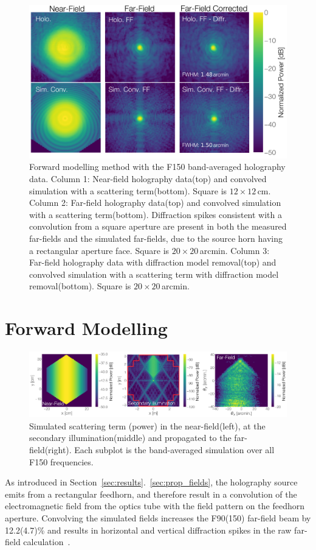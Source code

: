 \begin{figure}[t!]
    \centering
    \includegraphics[width = .9\textwidth]{Figures/forward_convolve_highres.pdf}
    \caption{Forward modelling method with the F150 band-averaged holography data. Column 1:  Near-field holography data(top) and convolved simulation with a scattering term(bottom).  Square is $12\times12\,$cm.  Column 2: Far-field holography data(top) and convolved simulation with a scattering term(bottom).  Diffraction spikes consistent with a convolution from a square aperture are present in both the measured far-fields and the simulated far-fields, due to the source horn having a rectangular aperture face.  Square is $20\times20\,$arcmin.  Column 3:  Far-field holography data with diffraction model removal(top) and convolved simulation with a scattering term with diffraction model removal(bottom). Square is $20\times20\,$arcmin.}
    \label{fig:forward_model}
\end{figure}
\section{Forward Modelling}
\label{sec:forward_model}
\begin{figure}[t]
    \centering
    \includegraphics[width = .95\textwidth]{Figures/scatter_model.pdf}
    \caption{Simulated scattering term (power) in the near-field(left), at the secondary illumination(middle) and propagated to the far-field(right).  Each subplot is the band-averaged simulation over all F150 frequencies.}
    \label{fig:scattering_forward}
\end{figure}
As introduced in Section~\ref{sec:results}.~\ref{sec:prop_fields}, the holography source emits from a rectangular feedhorn, and therefore result in a convolution of the electromagnetic field from the optics tube with the field pattern on the feedhorn aperture.  Convolving the simulated fields increases the F90(150) far-field beam by 12.2(4.7)\% and results in horizontal and vertical diffraction spikes in the raw far-field calculation~\cite{Goodman2005-ne}.

